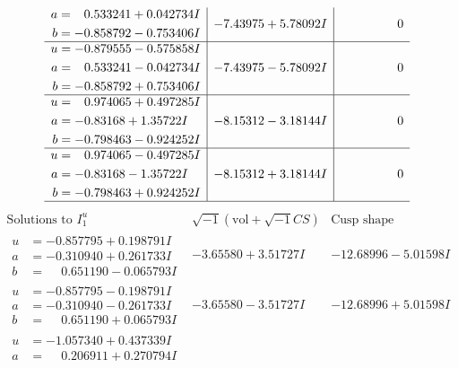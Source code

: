 \documentclass[1p]{elsarticle_modified}
\theoremstyle{definition}
\newcommand{\I}{\sqrt{-1}}
\begin{document}
$$\begin{array}{c|c|c}
\begin{aligned}
a &= \phantom{-}0.533241 + 0.042734 I \\
b &= -0.858792 - 0.753406 I\end{aligned}
 & -7.43975 + 5.78092 I & \phantom{-0.000000 } 0 \\ \hline\begin{aligned}
u &= -0.879555 - 0.575858 I \\
a &= \phantom{-}0.533241 - 0.042734 I \\
b &= -0.858792 + 0.753406 I\end{aligned}
 & -7.43975 - 5.78092 I & \phantom{-0.000000 } 0 \\ \hline\begin{aligned}
u &= \phantom{-}0.974065 + 0.497285 I \\
a &= -0.83168 + 1.35722 I \\
b &= -0.798463 - 0.924252 I\end{aligned}
 & -8.15312 - 3.18144 I & \phantom{-0.000000 } 0 \\ \hline\begin{aligned}
u &= \phantom{-}0.974065 - 0.497285 I \\
a &= -0.83168 - 1.35722 I \\
b &= -0.798463 + 0.924252 I\end{aligned}
 & -8.15312 + 3.18144 I & \phantom{-0.000000 } 0\\
 \hline 
 \end{array}$$\newpage$$\begin{array}{c|c|c}  
\text{Solutions to }I^u_{1}& \I (\text{vol} + \sqrt{-1}CS) & \text{Cusp shape}\\
 \hline 
\begin{aligned}
u &= -0.857795 + 0.198791 I \\
a &= -0.310940 + 0.261733 I \\
b &= \phantom{-}0.651190 - 0.065793 I\end{aligned}
 & -3.65580 + 3.51727 I & -12.68996 - 5.01598 I \\ \hline\begin{aligned}
u &= -0.857795 - 0.198791 I \\
a &= -0.310940 - 0.261733 I \\
b &= \phantom{-}0.651190 + 0.065793 I\end{aligned}
 & -3.65580 - 3.51727 I & -12.68996 + 5.01598 I \\ \hline\begin{aligned}
u &= -1.057340 + 0.437339 I \\
a &= \phantom{-}0.206911 + 0.270794 I \\

\end{aligned}
\end{array}$$
\end{document}
